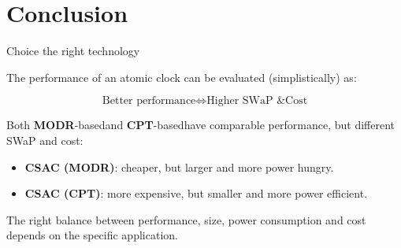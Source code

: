 \section{Conclusion}

\begin{frame}{Choice the right technology}

    The performance of an atomic clock can be evaluated (simplistically) as:

    \begin{equation}
        \text{Better performance} \Leftrightarrow \text{Higher SWaP \& Cost}
    \end{equation}

    \vspace{10pt}

    Both \textbf{MODR}-based\footnotemark[1] and \textbf{CPT}-based\footnotemark[2] have comparable performance, but different SWaP and cost:

    \begin{itemize}
        \item \textbf{CSAC (MODR)}: cheaper, but larger and more power hungry.
        \item \textbf{CSAC (CPT)}: more expensive, but smaller and more power efficient.
    \end{itemize}

    \vspace{10pt}

    The right balance between performance, size, power consumption and cost depends on the specific application.


\end{frame}
